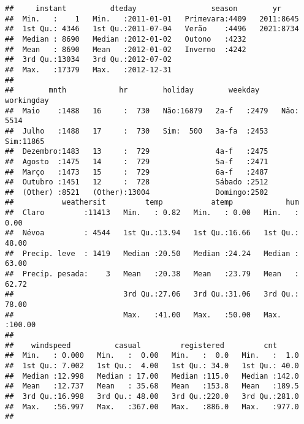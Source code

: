 \documentclass[
]{article}
\begin{document}
\begin{verbatim}
##     instant          dteday                 season        yr      
##  Min.   :    1   Min.   :2011-01-01   Primevara:4409   2011:8645  
##  1st Qu.: 4346   1st Qu.:2011-07-04   Verão    :4496   2021:8734  
##  Median : 8690   Median :2012-01-02   Outono   :4232              
##  Mean   : 8690   Mean   :2012-01-02   Inverno  :4242              
##  3rd Qu.:13034   3rd Qu.:2012-07-02                               
##  Max.   :17379   Max.   :2012-12-31                               
##                                                                   
##        mnth            hr        holiday        weekday     workingday 
##  Maio    :1488   16     :  730   Não:16879   2a-f   :2479   Não: 5514  
##  Julho   :1488   17     :  730   Sim:  500   3a-fa  :2453   Sim:11865  
##  Dezembro:1483   13     :  729               4a-f   :2475              
##  Agosto  :1475   14     :  729               5a-f   :2471              
##  Março   :1473   15     :  729               6a-f   :2487              
##  Outubro :1451   12     :  728               Sábado :2512              
##  (Other) :8521   (Other):13004               Domingo:2502              
##           weathersit         temp           atemp            hum        
##  Claro         :11413   Min.   : 0.82   Min.   : 0.00   Min.   :  0.00  
##  Névoa         : 4544   1st Qu.:13.94   1st Qu.:16.66   1st Qu.: 48.00  
##  Precip. leve  : 1419   Median :20.50   Median :24.24   Median : 63.00  
##  Precip. pesada:    3   Mean   :20.38   Mean   :23.79   Mean   : 62.72  
##                         3rd Qu.:27.06   3rd Qu.:31.06   3rd Qu.: 78.00  
##                         Max.   :41.00   Max.   :50.00   Max.   :100.00  
##                                                                         
##    windspeed          casual         registered         cnt       
##  Min.   : 0.000   Min.   :  0.00   Min.   :  0.0   Min.   :  1.0  
##  1st Qu.: 7.002   1st Qu.:  4.00   1st Qu.: 34.0   1st Qu.: 40.0  
##  Median :12.998   Median : 17.00   Median :115.0   Median :142.0  
##  Mean   :12.737   Mean   : 35.68   Mean   :153.8   Mean   :189.5  
##  3rd Qu.:16.998   3rd Qu.: 48.00   3rd Qu.:220.0   3rd Qu.:281.0  
##  Max.   :56.997   Max.   :367.00   Max.   :886.0   Max.   :977.0  
## 
\end{verbatim}
\end{document}
